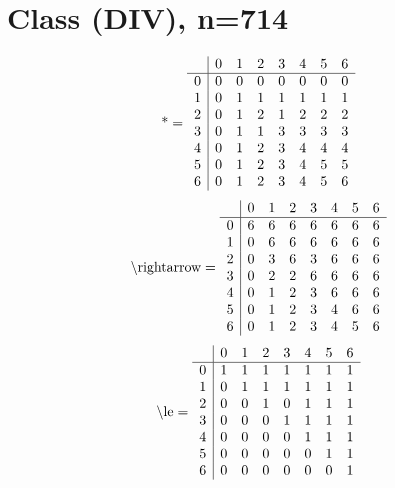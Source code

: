 \documentclass[11pt]{article}
\begin{document}
\section{Class (DIV), n=714}
\[\text{*} = 
\begin{array}{r | r r r r r r r}
 & 0 & 1 & 2 & 3 & 4 & 5 & 6 \\ \hline
0 & 0 & 0 & 0 & 0 & 0 & 0 & 0 \\
1 & 0 & 1 & 1 & 1 & 1 & 1 & 1 \\
2 & 0 & 1 & 2 & 1 & 2 & 2 & 2 \\
3 & 0 & 1 & 1 & 3 & 3 & 3 & 3 \\
4 & 0 & 1 & 2 & 3 & 4 & 4 & 4 \\
5 & 0 & 1 & 2 & 3 & 4 & 5 & 5 \\
6 & 0 & 1 & 2 & 3 & 4 & 5 & 6 \\
\end{array}
\]
\[\text{\textbackslash rightarrow} = 
\begin{array}{r | r r r r r r r}
 & 0 & 1 & 2 & 3 & 4 & 5 & 6 \\ \hline
0 & 6 & 6 & 6 & 6 & 6 & 6 & 6 \\
1 & 0 & 6 & 6 & 6 & 6 & 6 & 6 \\
2 & 0 & 3 & 6 & 3 & 6 & 6 & 6 \\
3 & 0 & 2 & 2 & 6 & 6 & 6 & 6 \\
4 & 0 & 1 & 2 & 3 & 6 & 6 & 6 \\
5 & 0 & 1 & 2 & 3 & 4 & 6 & 6 \\
6 & 0 & 1 & 2 & 3 & 4 & 5 & 6 \\
\end{array}
\]
\[\text{\textbackslash le} = 
\begin{array}{r | r r r r r r r}
 & 0 & 1 & 2 & 3 & 4 & 5 & 6 \\ \hline
0 & 1 & 1 & 1 & 1 & 1 & 1 & 1 \\
1 & 0 & 1 & 1 & 1 & 1 & 1 & 1 \\
2 & 0 & 0 & 1 & 0 & 1 & 1 & 1 \\
3 & 0 & 0 & 0 & 1 & 1 & 1 & 1 \\
4 & 0 & 0 & 0 & 0 & 1 & 1 & 1 \\
5 & 0 & 0 & 0 & 0 & 0 & 1 & 1 \\
6 & 0 & 0 & 0 & 0 & 0 & 0 & 1 \\
\end{array}
\]
\end{document}
